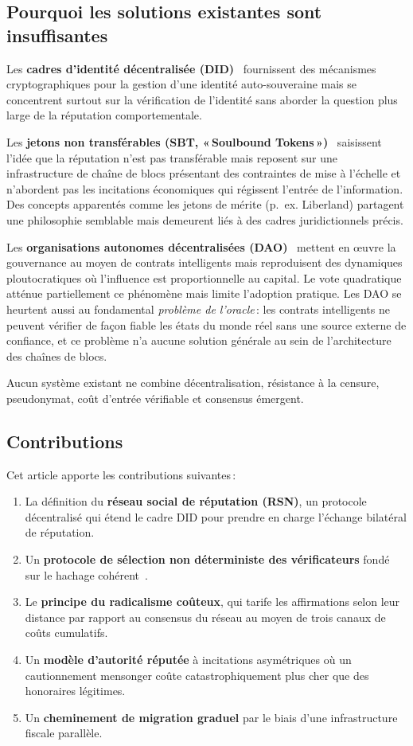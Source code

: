 \documentclass[11pt,a4paper,twocolumn]{article}
\begin{document}
\subsection{Pourquoi les solutions existantes sont insuffisantes}

Les \textbf{cadres d'identité décentralisée (DID)}~\cite{did2022} fournissent des mécanismes cryptographiques pour la gestion d'une identité auto-souveraine mais se concentrent surtout sur la vérification de l'identité sans aborder la question plus large de la réputation comportementale.

Les \textbf{jetons non transférables (SBT, «\,Soulbound Tokens\,»)}~\cite{weyl2022} saisissent l'idée que la réputation n'est pas transférable mais reposent sur une infrastructure de chaîne de blocs présentant des contraintes de mise à l'échelle et n'abordent pas les incitations économiques qui régissent l'entrée de l'information. Des concepts apparentés comme les jetons de mérite (p.~ex. Liberland) partagent une philosophie semblable mais demeurent liés à des cadres juridictionnels précis.

Les \textbf{organisations autonomes décentralisées (DAO)}~\cite{buterin2014} mettent en \oe uvre la gouvernance au moyen de contrats intelligents mais reproduisent des dynamiques ploutocratiques où l'influence est proportionnelle au capital. Le vote quadratique~\cite{buterin2019} atténue partiellement ce phénomène mais limite l'adoption pratique. Les DAO se heurtent aussi au fondamental \emph{problème de l'oracle}\,: les contrats intelligents ne peuvent vérifier de façon fiable les états du monde réel sans une source externe de confiance, et ce problème n'a aucune solution générale au sein de l'architecture des chaînes de blocs.

Aucun système existant ne combine décentralisation, résistance à la censure, pseudonymat, coût d'entrée vérifiable et consensus émergent.

\subsection{Contributions}

Cet article apporte les contributions suivantes\,:
\begin{enumerate}[nosep]
\item La définition du \textbf{réseau social de réputation (RSN)}, un protocole décentralisé qui étend le cadre DID pour prendre en charge l'échange bilatéral de réputation.
\item Un \textbf{protocole de sélection non déterministe des vérificateurs} fondé sur le hachage cohérent~\cite{karger1997}.
\item Le \textbf{principe du radicalisme coûteux}, qui tarife les affirmations selon leur distance par rapport au consensus du réseau au moyen de trois canaux de coûts cumulatifs.
\item Un \textbf{modèle d'autorité réputée} à incitations asymétriques où un cautionnement mensonger coûte catastrophiquement plus cher que des honoraires légitimes.
\item Un \textbf{cheminement de migration graduel} par le biais d'une infrastructure fiscale parallèle.
\end{enumerate}
\end{document}
